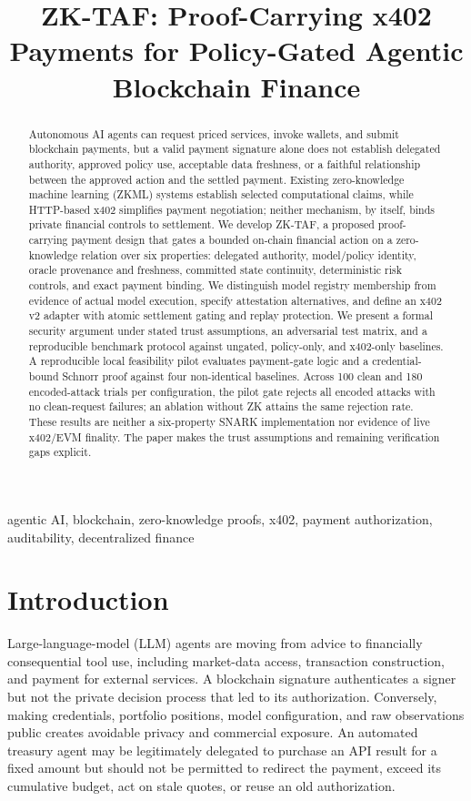 \documentclass[conference]{IEEEtran}
\title{ZK-TAF: Proof-Carrying x402 Payments for Policy-Gated Agentic Blockchain Finance}
\author{\IEEEauthorblockN{Anonymous Authors}\IEEEauthorblockA{Affiliations omitted for double-blind review}}
\newcommand{\zktaf}{\textsc{ZK-TAF}}
\begin{document}
\maketitle
\begin{abstract}
Autonomous AI agents can request priced services, invoke wallets, and submit blockchain payments, but a valid payment signature alone does not establish delegated authority, approved policy use, acceptable data freshness, or a faithful relationship between the approved action and the settled payment. Existing zero-knowledge machine learning (ZKML) systems establish selected computational claims, while HTTP-based x402 simplifies payment negotiation; neither mechanism, by itself, binds private financial controls to settlement. We develop \zktaf, a proposed proof-carrying payment design that gates a bounded on-chain financial action on a zero-knowledge relation over six properties: delegated authority, model/policy identity, oracle provenance and freshness, committed state continuity, deterministic risk controls, and exact payment binding. We distinguish model registry membership from evidence of actual model execution, specify attestation alternatives, and define an x402 v2 adapter with atomic settlement gating and replay protection. We present a formal security argument under stated trust assumptions, an adversarial test matrix, and a reproducible benchmark protocol against ungated, policy-only, and x402-only baselines. A reproducible local feasibility pilot evaluates payment-gate logic and a credential-bound Schnorr proof against four non-identical baselines. Across 100 clean and 180 encoded-attack trials per configuration, the pilot gate rejects all encoded attacks with no clean-request failures; an ablation without ZK attains the same rejection rate. These results are neither a six-property SNARK implementation nor evidence of live x402/EVM finality. The paper makes the trust assumptions and remaining verification gaps explicit.
\end{abstract}
\begin{IEEEkeywords}
agentic AI, blockchain, zero-knowledge proofs, x402, payment authorization, auditability, decentralized finance
\end{IEEEkeywords}

\section{Introduction}
Large-language-model (LLM) agents are moving from advice to financially consequential tool use, including market-data access, transaction construction, and payment for external services. A blockchain signature authenticates a signer but not the private decision process that led to its authorization. Conversely, making credentials, portfolio positions, model configuration, and raw observations public creates avoidable privacy and commercial exposure. An automated treasury agent may be legitimately delegated to purchase an API result for a fixed amount but should not be permitted to redirect the payment, exceed its cumulative budget, act on stale quotes, or reuse an old authorization.
\end{document}
